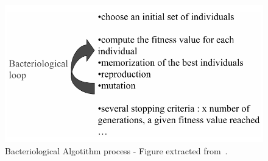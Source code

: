 \begin{figure}[htbp]
	\centering
	\includegraphics[width=\columnwidth]{img/ba.png}
	\caption{Bacteriological Algotithm process - Figure extracted from~\cite{baudry}.}\label{fig:ba}
\end{figure}

